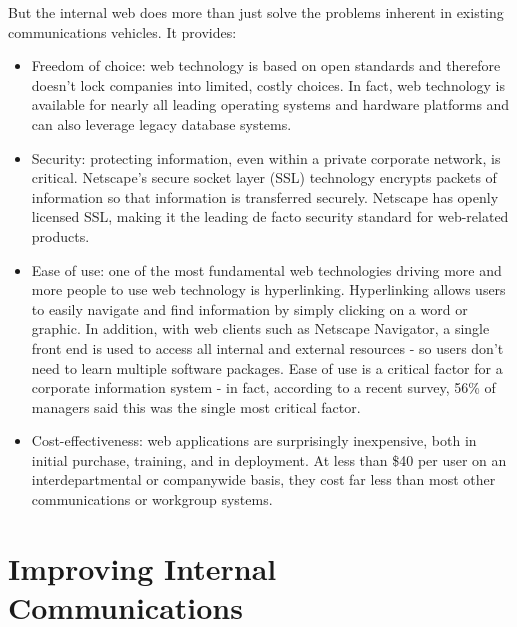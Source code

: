 But the internal web does more than just solve the problems inherent in
existing communications vehicles. It provides:
\begin{itemize}
  \item Freedom of choice: web technology is based on open standards and
therefore doesn't lock companies into limited, costly choices. In fact,
web technology is available for nearly all leading operating systems
and hardware platforms and can also leverage legacy database systems.

  \item Security: protecting information, even within a private corporate
network, is critical. Netscape's secure socket layer (SSL) technology
encrypts packets of information so that information is transferred
securely. Netscape has openly licensed SSL, making it the leading de
facto security standard for web-related products.

  \item Ease of use: one of the most fundamental web technologies driving
more and more people to use web technology is hyperlinking.
Hyperlinking allows users to easily navigate and find information by
simply clicking on a word or graphic. In addition, with web clients
such as Netscape Navigator, a single front end is used to access all
internal and external resources - so users don't need to learn multiple
software packages. Ease of use is a critical factor for a corporate
information system - in fact, according to a recent survey, 56\% of
managers said this was the single most critical factor.

  \item Cost-effectiveness: web applications are surprisingly inexpensive,
both in initial purchase, training, and in deployment. At less than \$40
per user on an interdepartmental or companywide basis, they cost far
less than most other communications or workgroup systems.
\end{itemize}


\section{Improving Internal Communications}

